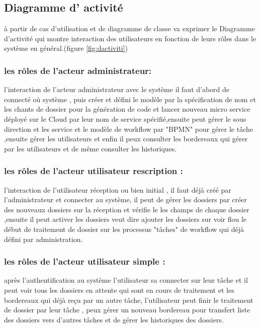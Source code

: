 \subsection{Diagramme d' activité  }

à partir de cas d'utilisation et de diagramme de classe  va exprimer  le Diagramme d'activité qui  montre interaction des  utilisateurs   en fonction de leurs rôles dans le système en général.(figure \ref{fig:dactiviti})

\subsubsection{les rôles de l'acteur administrateur: }
l'interaction de l'acteur administrateur avec le système il faut d'abord de connecté où système , puis créer  et  défini le modèle par la spécification de   nom et  les chants de dossier  pour la génération de code et lancer nouveau micro service déployé sur le Cloud par leur nom de service spécifié,ensuite peut gérer le sous direction et les service et le modèle de workflow par "BPMN"  pour gérer le tâche   ,ensuite   gérer les utilisateurs  et enfin  il peux consulter les bordereaux qui gérer par les utilisateurs et de même  consulter les historiques.

\subsubsection{les rôles de l'acteur utilisateur rescription : }
l'interaction de l'utilisateur réception ou bien initial , il faut déjà créé par l'administrateur  et connecter au système, il peut de  gérer les dossiers par créer des nouveaux dossiers sur la réception et vérifie le   les champs  de chaque dossier ,ensuite il peut activer les dossiers veut dire ajouter les dossiers sur voir flou le début de traitement de dossier sur les processus "tâches" de workflow qui déjà défini par administration. 

\subsubsection{les rôles de l'acteur utilisateur simple : } 
 après l'authentification au système l'utilisateur sa connecter  sur leur tâche et il peut voir tous les dossiers en attente qui sont en cours de traitement et les bordereaux qui  déjà reçu par un autre tâche, l'utilisateur peut finir le traitement de dossier par leur tâche , peux gérer un nouveau bordereau pour transfert liste des dossiers vers d'autres tâches  et de gérer les historiques des dossiers.
   
